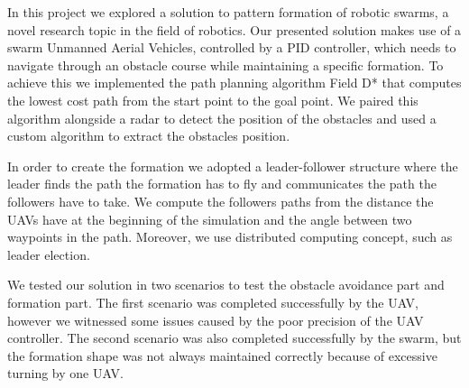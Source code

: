 In this project we explored a solution to pattern formation of robotic swarms, a novel research topic
in the field of robotics. Our presented solution makes use of a swarm Unmanned Aerial Vehicles, controlled
by a PID controller, which needs to navigate through an obstacle course while maintaining a specific formation. 
To achieve this we implemented the path planning algorithm Field D* that computes the lowest cost path from the 
start point to the goal point. We paired this algorithm alongside a radar to detect the position of the obstacles
and used a custom algorithm to extract the obstacles position. 

In order to create the formation we adopted a leader-follower structure where the leader finds the path the formation
has to fly and communicates the path the followers have to take. We compute the followers paths from the distance
the UAVs have at the beginning of the simulation and the angle between two waypoints in the path. Moreover, we use
distributed computing concept, such as leader election. 

We tested our solution in two scenarios to test the obstacle avoidance part and formation part. The first scenario
was completed successfully by the UAV, however we witnessed some issues caused by the poor precision of the UAV
controller. The second scenario was also completed successfully by the swarm, but the formation shape was not
always maintained correctly because of excessive turning by one UAV.

\printbibliography

